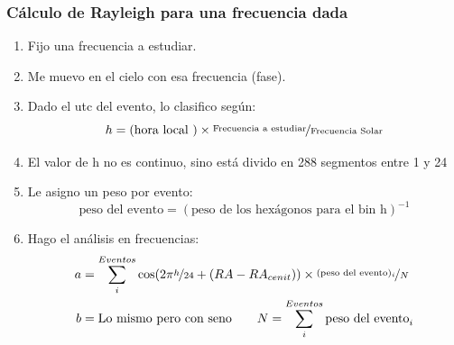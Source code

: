   \subsubsection{Cálculo de Rayleigh para una frecuencia dada}

      \begin{enumerate}
        \item Fijo una frecuencia a estudiar.
        \item Me muevo en el cielo con esa frecuencia (fase).
        \item Dado el utc del evento, lo clasifico según:
        \begin{equation*}
          h = (\text{hora local })\times \nicefrac{\text{Frecuencia a estudiar}}{\text{Frecuencia Solar}}
        \end{equation*}
          \item El valor de h no es continuo, sino está divido en 288 segmentos entre 1 y 24
       \item Le asigno un peso por evento:
        \begin{equation*}
          \text{peso del evento} = (\text{peso  de los hexágonos para el bin h})^{-1}
          \end{equation*} 
         \item Hago el análisis en frecuencias:
         \begin{align*}
             a &= \sum^{Eventos}_i \cos(2\pi \nicefrac{h}{24} + (RA -RA_{cenit}))\times \nicefrac{(\text{peso del evento})_i}{N}\\
             b &= \text{Lo mismo pero con seno}\qquad         N = \sum^{Eventos}_i \text{peso del evento}_i
         \end{align*}
      \end{enumerate}